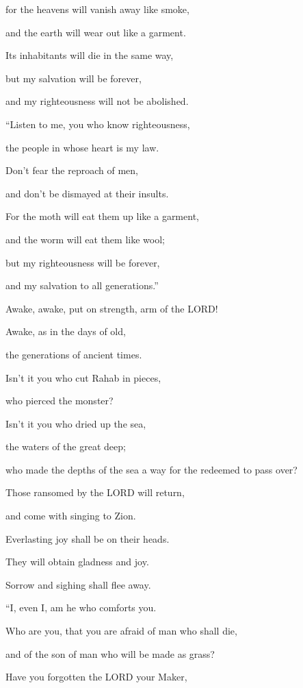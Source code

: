 for the heavens will vanish away like smoke,

and the earth will wear out like a garment.

Its inhabitants will die in the same way,

but my salvation will be forever,

and my righteousness will not be abolished.


\vspace{\baselineskip} \myverse{}“Listen to me, you who know righteousness,

the people in whose heart is my law.

Don’t fear the reproach of men,

and don’t be dismayed at their insults.

\myverse{}For the moth will eat them up like a garment,

and the worm will eat them like wool;

but my righteousness will be forever,

and my salvation to all generations.”


\vspace{\baselineskip} \myverse{}Awake, awake, put on strength, arm of the LORD!

Awake, as in the days of old,

the generations of ancient times.

Isn’t it you who cut Rahab in pieces,

who pierced the monster?

\myverse{}Isn’t it you who dried up the sea,

the waters of the great deep;

who made the depths of the sea a way for the redeemed to pass over?

\myverse{}Those ransomed by the LORD will return,

and come with singing to Zion.

Everlasting joy shall be on their heads.

They will obtain gladness and joy.

Sorrow and sighing shall flee away.


\vspace{\baselineskip} \myverse{}“I, even I, am he who comforts you.

Who are you, that you are afraid of man who shall die,

and of the son of man who will be made as grass?

\myverse{}Have you forgotten the LORD your Maker,

